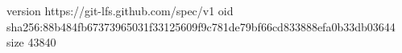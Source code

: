 version https://git-lfs.github.com/spec/v1
oid sha256:88b484fb67373965031f33125609f9c781de79bf66cd833888efa0b33db03644
size 43840
